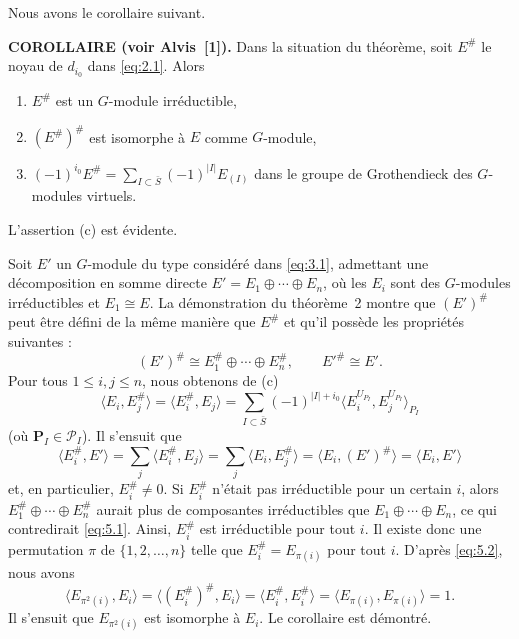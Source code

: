 \documentclass[10pt,a4paper]{article}
\theoremstyle{plain}
\theoremstyle{definition}
\theoremstyle{remark}
\newcommand{\cP}{\mathcal{P}}
\newcommand{\bP}{\mathbf{P}}
\begin{document}
Nous avons le corollaire suivant.

\medskip\noindent\textbf{COROLLAIRE (voir Alvis~[1]).}\quad
Dans la situation du théorème, soit $E^\#$ le noyau de $d_{i_0}$ dans \eqref{eq:2.1}. Alors
\begin{enumerate}[label=(\alph*)]
\item $E^\#$ est un $G$-module irréductible,
\item $(E^\#)^\#$ est isomorphe à $E$ comme $G$-module,
\item $(-1)^{i_0} E^\# = \sum_{I \subset \bar S} (-1)^{|I|} E_{(I)}$ dans le groupe de Grothendieck des $G$-modules virtuels.
\end{enumerate}

L'assertion (c) est évidente.

Soit $E'$ un $G$-module du type considéré dans \eqref{eq:3.1}, admettant une décomposition en somme directe $E' = E_1 \oplus \cdots \oplus E_n$, où les $E_i$ sont des $G$-modules irréductibles et $E_1 \cong E$. La démonstration du théorème~2 montre que $(E')^\#$ peut être défini de la même manière que $E^\#$ et qu'il possède les propriétés suivantes :
\begin{equation}\tag{5.1}\label{eq:5.1}
(E')^\# \cong E_1^\# \oplus \cdots \oplus E_n^\#, \qquad E'^\# \cong E'.
\end{equation}
Pour tous $1 \leq i, j \leq n$, nous obtenons de (c)
\begin{equation}\tag{5.2}\label{eq:5.2}
\langle E_i, E_j^\# \rangle = \langle E_i^\#, E_j \rangle = \sum_{I \subset \bar S} (-1)^{|I|+i_0} \langle E_i^{U_{P_I}}, E_j^{U_{P_I}} \rangle_{P_I}
\end{equation}
(où $\bP_I \in \cP_I$). Il s'ensuit que
\begin{equation*}
\langle E_i^\#, E' \rangle = \sum_j \langle E_i^\#, E_j \rangle = \sum_j \langle E_i, E_j^\# \rangle = \langle E_i, (E')^\# \rangle = \langle E_i, E' \rangle
\end{equation*}
et, en particulier, $E_i^\# \neq 0$. Si $E_i^\#$ n'était pas irréductible pour un certain $i$, alors $E_1^\# \oplus \cdots \oplus E_n^\#$ aurait plus de composantes irréductibles que $E_1 \oplus \cdots \oplus E_n$, ce qui contredirait \eqref{eq:5.1}. Ainsi, $E_i^\#$ est irréductible pour tout $i$. Il existe donc une permutation $\pi$ de $\{1,2,\dots,n\}$ telle que $E_i^\# = E_{\pi(i)}$ pour tout $i$. D'après \eqref{eq:5.2}, nous avons
\begin{equation*}
\langle E_{\pi^2(i)}, E_i \rangle = \langle (E_i^\#)^\#, E_i \rangle = \langle E_i^\#, E_i^\# \rangle = \langle E_{\pi(i)}, E_{\pi(i)} \rangle = 1.
\end{equation*}
Il s'ensuit que $E_{\pi^2(i)}$ est isomorphe à $E_i$. Le corollaire est démontré.
\end{document}
